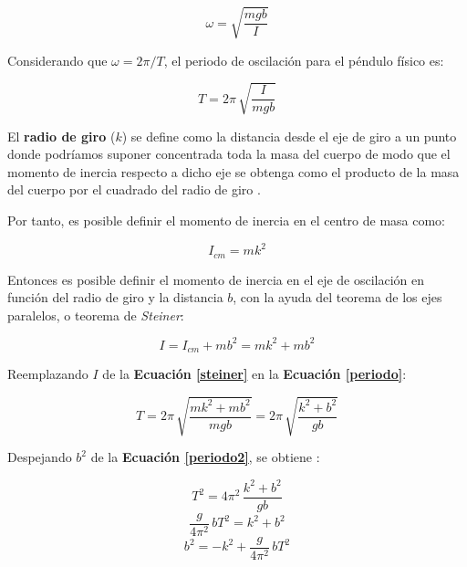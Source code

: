 \documentclass[letter,11pt]{article}
\begin{document}
\begin{equation*}
    \omega = \sqrt{\frac{mgb}{I}}
\end{equation*}
\vspace{0.10cm}

Considerando que $\omega = 2\pi / T$, el periodo de oscilación para el péndulo
físico es:

\begin{equation}
    T = 2\pi\, \sqrt{\frac{I}{mgb}}
\label{periodo}
\end{equation}
\vspace{0.10cm}

El \textbf{radio de giro} ($k$) se define como la distancia desde el eje de giro
a un punto donde podríamos suponer concentrada toda la masa del cuerpo de modo
que el momento de inercia respecto a dicho eje se obtenga como el producto de la
masa del cuerpo por el cuadrado del radio de giro \cite{RADIO}.

Por tanto, es posible definir el momento de inercia en el centro de masa como:

\begin{equation}
    I_{cm} = m k^2
\label{radiodegiro}
\end{equation}
\vspace{0.10cm}

Entonces es posible definir el momento de inercia en el eje de oscilación en
función del radio de giro y la distancia $b$, con la ayuda del teorema de los
ejes paralelos, o teorema de \emph{Steiner}:

\begin{equation}
    I = I_{cm} + mb^2 = m k^2 + m b^2
\label{steiner}
\end{equation}
\vspace{0.10cm}

Reemplazando $I$ de la \textbf{Ecuación \ref{steiner}} en la
\textbf{Ecuación \ref{periodo}}:

\begin{equation}
    T = 2\pi\, \sqrt{\frac{m k^2 + m b^2}{mgb}}
      = 2\pi\, \sqrt{\frac{k^2 + b^2}{gb}}
\label{periodo2}
\end{equation}
\vspace{0.10cm}

Despejando $b^2$ de la \textbf{Ecuación \ref{periodo2}}, se obtiene \cite{GUIA}:

\begin{equation*}
    T^2 = 4\pi^2\, \frac{k^2 + b^2}{gb}
\end{equation*}
\begin{equation*}
    \frac{g}{4\pi^2}\, bT^2 = k^2 + b^2
\end{equation*}
\begin{equation}
    b^2 = -k^2 + \frac{g}{4\pi^2}\, bT^2
\label{funcional}
\end{equation}
\vspace{0.10cm}
\end{document}
